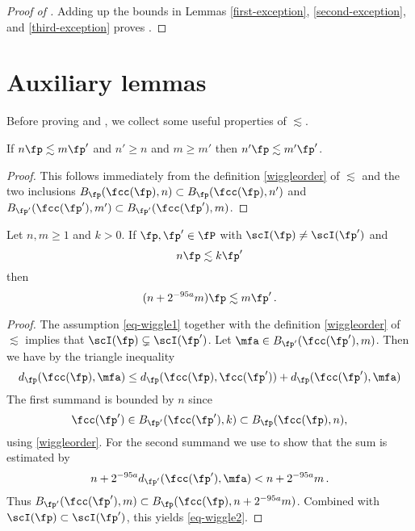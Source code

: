 \begin{proof}[Proof of ]
Adding up the bounds in Lemmas \ref{first-exception}, \ref{second-exception}, and \ref{third-exception} proves .
\end{proof}


\section{Auxiliary lemmas}
\label{subsec-lessim-aux}
Before proving  and , we collect some useful properties of $\lesssim$.

\begin{lemma}
    \label{wiggle-order-1}
    \leanok
    If $n\fp \lesssim m\fp'$ and
    $n' \ge n$ and $m \ge m'$ then $n'\fp \lesssim m'\fp'$.
\end{lemma}

\begin{proof}
    \leanok
    This follows immediately from the definition \eqref{wiggleorder} of $\lesssim$ and the two inclusions $B_{\fp}(\fcc(\fp), n) \subset B_{\fp}(\fcc(\fp), n')$ and $B_{\fp'}(\fcc(\fp'), m') \subset B_{\fp'}(\fcc(\fp'), m)$.
\end{proof}

\begin{lemma}
    \label{wiggle-order-2}
    \leanok

    Let $n, m \ge 1$ and $k > 0$.
    If $\fp, \fp' \in \fP$ with $\scI(\fp) \ne \scI(\fp')$ and
    \begin{equation}
        \label{eq-wiggle1}
        n \fp \lesssim k \fp'
    \end{equation}
    then
    \begin{equation}
        \label{eq-wiggle2}
        (n + 2^{-95 a} m) \fp \lesssim m\fp'\,.
    \end{equation}
\end{lemma}

\begin{proof}
    \leanok
    The assumption \eqref{eq-wiggle1} together with the definition \eqref{wiggleorder} of $\lesssim$ implies that $\scI(\fp) \subsetneq \scI(\fp')$. Let $\mfa \in B_{\fp'}(\fcc(\fp'), m)$. Then we have by the triangle inequality
    $$
        d_{\fp}(\fcc(\fp), \mfa) \le d_{\fp}(\fcc(\fp), \fcc(\fp')) + d_{\fp}(\fcc(\fp'), \mfa)
    $$
    The first summand is bounded by $n$ since
    $$
        \fcc(\fp') \in B_{\fp'}(\fcc(\fp'), k) \subset B_{\fp}(\fcc(\fp), n),
    $$
    using \eqref{wiggleorder}. For the second summand we use 
    to show that the sum is estimated by
    $$
        n + 2^{-95a} d_{\fp'}(\fcc(\fp'), \mfa) < n + 2^{-95a} m\,.
    $$
    Thus $B_{\fp'}(\fcc(\fp'),m) \subset B_{\fp}(\fcc(\fp),n + 2^{-95a}m)$. Combined with $\scI(\fp) \subset \scI(\fp')$, this yields \eqref{eq-wiggle2}.
\end{proof}

